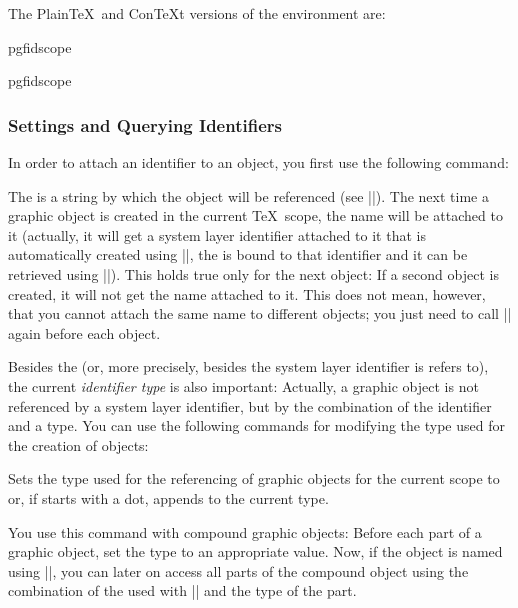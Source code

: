 The Plain\TeX\ and Con\TeX t versions of the environment are:
%
\begin{plainenvironment}{{pgfidscope}}
\end{plainenvironment}

\begin{contextenvironment}{{pgfidscope}}
\end{contextenvironment}


\subsubsection{Settings and Querying Identifiers}

In order to attach an identifier to an object, you first use the following
command:

\begin{command}{\pgfuseid{}}
    The  is a string by which the object will be referenced (see
    |\pgfidrefnextuse|). The next time a graphic object is created in the
    current \TeX\ scope, the name will be attached to it (actually, it will get
    a system layer identifier attached to it that is automatically created
    using |\pgfsys@new@id|, the  is bound to that identifier and it
    can be retrieved using |\pgfidrefnextuse|). This holds true only for the
    next object: If a second object is created, it will not get the name
    attached to it. This does not mean, however, that you cannot attach the
    same name to different objects; you just need to call |\pgfuseid| again
    before each object.

    Besides the  (or, more precisely, besides the system layer
    identifier is refers to), the current \emph{identifier type} is also
    important: Actually, a graphic object is not referenced by a system layer
    identifier, but by the combination of the identifier and a type. You can
    use the following commands for modifying the type used for the creation of
    objects:

    \begin{command}{\pgfusetype{}}
        Sets the type used for the referencing of graphic objects for the
        current scope to  or, if  starts with a dot,
        appends  to the current type.

        You use this command with compound graphic objects: Before each part of
        a graphic object, set the type to an appropriate value. Now, if the
        object is named using |\pgfuseid|, you can later on access all parts of
        the compound object using the combination of the  used with
        |\pgfuseid| and the type of the part.


\end{command}
\end{command}
